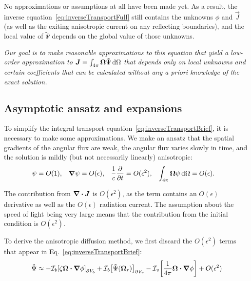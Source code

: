 
No approximations or assumptions at all have been made yet. As a
result, the inverse equation~\eqref{eq:inverseTransportFull} still contains
the unknowns $\phi$ and $\vec{J}$ (as well as the exiting anisotropic current on
any reflecting boundaries), and the local value of
$\tilde\Psi$ depends on the global value of those unknowns.

\emph{
Our goal is to make reasonable approximations to this equation that yield a
low-order approximation to $\bm{J}=\int_{4\pi}\bm{\Omega} \tilde\Psi \mathop{}\!\mathrm{d}\Omega$ that
depends only on local unknowns and certain coefficients that can be calculated
without any \emph{a priori} knowledge of the exact solution.
}

\subsection{Asymptotic ansatz and expansions}
To simplify the integral transport
equation~\eqref{eq:inverseTransportBrief}, it is necessary to make some
approximations. We make an ansatz that the spatial gradients of the angular flux
are weak, the angular flux varies slowly in time, and the solution is mildly
(but not necessarily linearly) anisotropic:
\begin{align} \label{eq:ansatz}
  \psi &= O(1), &
  \bm{\nabla} \psi &= O(\epsilon), &
  \frac{1}{c}\frac{\partial }{\partial t} &= O(\epsilon^2), &
  \int_{4\pi} \bm{\Omega} \psi\mathop{}\!\mathrm{d}\Omega &= O(\epsilon).
\end{align}

The contribution from $\bm{\nabla} \bm{\cdot}\bm{J}$ is $O(\epsilon^2)$, as the term
contains an $O(\epsilon)$ derivative as well as the $O(\epsilon)$ radiation
current.  The assumption about the speed of light being very large means that the
contribution from the initial condition is $O(\epsilon^2)$.

To derive the anisotropic diffusion method, we first discard the $O(\epsilon^2)$
terms that appear in Eq.~\eqref{eq:inverseTransportBrief}:
\begin{equation} \label{eq:approxPsi1}
  \tilde\Psi \approx 
  -\mathcal{I}_{b}\!\left[\zeta \bm{\Omega}\bm{\cdot} \bm{\nabla} \phi\right]_{\partial V_b}
  + \mathcal{I}_{b}\!\left[\tilde\Psi(\bm{\Omega}_r)\right]_{\partial V_r}
  - \mathcal{I}_{v}\!\left[\frac{1}{4\pi} \bm{\Omega}\bm{\cdot} \bm{\nabla} \phi\right]
  + O(\epsilon^2)
\end{equation}

